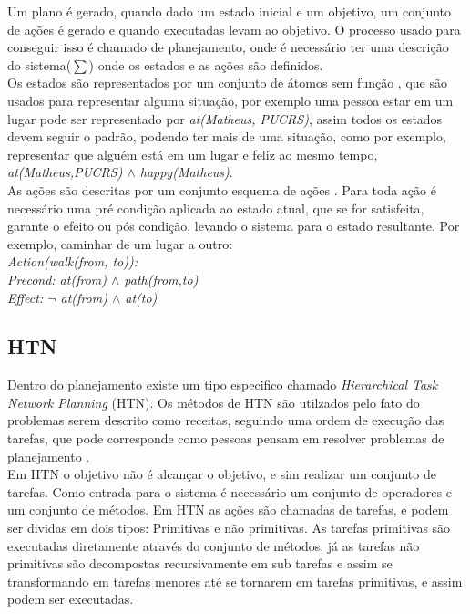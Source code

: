 Um plano é gerado, quando dado um estado inicial e um objetivo, um conjunto de ações é gerado e quando executadas levam ao objetivo. O processo usado para conseguir isso é chamado de planejamento, onde é necessário ter uma descrição do sistema($\sum$) onde os estados e as ações são definidos.\\ 
Os estados são representados por um conjunto de átomos sem função \cite{intelligence2003modern}, que são usados para representar alguma situação, por exemplo uma pessoa estar em um lugar pode ser representado por \textit{at(Matheus, PUCRS)}, assim todos os estados devem seguir o padrão, podendo ter mais de uma situação, como por exemplo, representar que alguém está em um lugar e feliz ao mesmo tempo, \textit{at(Matheus,PUCRS) $\wedge$ happy(Matheus)}. \\
As ações são descritas por um conjunto esquema de ações \cite{intelligence2003modern}. Para toda ação é necessário uma pré condição aplicada ao estado atual, que se for satisfeita, garante o efeito ou pós condição, levando o sistema para o estado resultante. Por exemplo, caminhar de um lugar a outro: \\
\textit{Action(walk(from, to)): \\
Precond: at(from)  $\wedge$ path(from,to) \\
Effect: $\neg$ at(from)  $\wedge$ at(to)}

\subsection{HTN} 
Dentro do planejamento existe um tipo especifico chamado \textit{Hierarchical Task Network Planning} (HTN). Os métodos de HTN são utilzados pelo fato do problemas serem descrito como receitas, seguindo uma ordem de execução das tarefas, que pode corresponde como pessoas pensam em resolver problemas de planejamento \cite{ghallab2004automated}.  \\
Em HTN o objetivo não é alcançar o objetivo, e sim realizar um conjunto de tarefas. Como entrada para o sistema é necessário um conjunto de operadores e um conjunto de métodos. Em HTN as ações são chamadas de tarefas, e podem ser dividas em dois tipos: Primitivas e não primitivas. As tarefas primitivas são executadas diretamente através do conjunto de métodos, já as tarefas não primitivas são decompostas recursivamente em sub tarefas e assim se transformando em tarefas menores até se tornarem em tarefas primitivas, e assim podem ser executadas. \\ 

